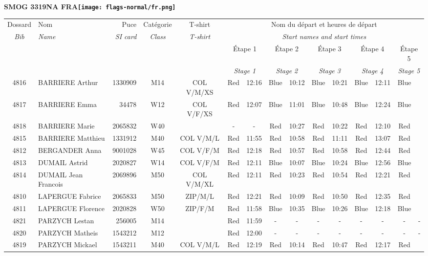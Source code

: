 \documentclass{report}
\begin{document}
\newpage
  \Huge \centering \bfseries SMOG 3319NA FRA\normalfont \footnotesize \sffamily \hfill \texttt{[image: flags-normal/fr.png]} \newline 
  \begin{longtable}{|c|l|r|c|c|*{5}{cc|}}
    Dossard & Nom  & Puce    & Catégorie & T-shirt & \multicolumn{10}{c|}{Nom du départ et heures de départ} \\
    \itshape Bib     & \itshape Name & \itshape SI card & \itshape Class  & \itshape  T-shirt  & \multicolumn{10}{c|}{\itshape Start names and start times} \\
    \hline
    & & & & & \multicolumn{2}{c|}{Étape 1} & \multicolumn{2}{c|}{Étape 2} & \multicolumn{2}{c|}{Étape 3} & \multicolumn{2}{c|}{Étape 4} & \multicolumn{2}{c|}{Étape 5} \\
    & & & & & \multicolumn{2}{c|}{\itshape Stage 1} & \multicolumn{2}{c|}{\itshape Stage 2} & \multicolumn{2}{c|}{\itshape Stage 3} & \multicolumn{2}{c|}{\itshape Stage 4} & \multicolumn{2}{c|}{\itshape Stage 5} \\
    \hline
    4816 & BARRIERE Arthur & 1330909 & M14 & COL V/M/XS & Red & 12:16 & Blue & 10:12 & Blue & 10:21 & Blue & 12:11 & Blue &  \\
    4817 & BARRIERE Emma & 34478 & W12 & COL V/F/XS & Red & 12:07 & Blue & 11:01 & Blue & 10:48 & Blue & 12:24 & Blue &  \\
    4818 & BARRIERE Marie & 2065832 & W40 &   & - &  - & Red & 10:27 & Red & 10:22 & Red & 12:10 & Red &  \\
    4815 & BARRIERE Matthieu & 1331912 & M40 & COL V/M/L & Red & 11:55 & Red & 10:58 & Red & 11:11 & Red & 13:07 & Red &  \\
    4812 & BERGANDER Anna & 9001028 & W45 & COL V/F/M & Red & 12:18 & Red & 10:57 & Red & 10:58 & Red & 12:44 & Red &  \\
    4813 & DUMAIL Astrid & 2020827 & W14 & COL V/F/M & Red & 12:11 & Blue & 10:07 & Blue & 10:24 & Blue & 12:56 & Blue &  \\
    4814 & DUMAIL Jean Francois & 2069896 & M50 & COL V/M/XL & Red & 12:11 & Red & 10:23 & Red & 10:54 & Red & 12:21 & Red &  \\
    4810 & LAPERGUE Fabrice & 2065833 & M50 & ZIP/M/L & Red & 12:21 & Red & 10:09 & Red & 10:50 & Red & 12:35 & Red &  \\
    4811 & LAPERGUE Florence & 2020828 & W50 & ZIP/F/M & Red & 11:58 & Blue & 10:35 & Blue & 10:26 & Blue & 12:18 & Blue &  \\
    4821 & PARZYCH Lestan & 256005 & M14 &   & Red & 11:59 & - &  - & - &  - & - &  - & - &  -\\
    4820 & PARZYCH Matheis & 1543212 & M12 &   & Red & 12:00 & - &  - & - &  - & - &  - & - &  -\\
    4819 & PARZYCH Mickael & 1543211 & M40 & COL V/M/L & Red & 12:19 & Red & 10:14 & Red & 10:47 & Red & 12:17 & Red &  \\
  \end{longtable}
\end{document}
